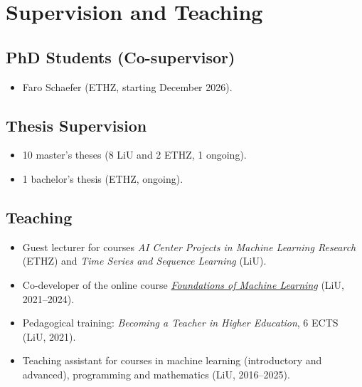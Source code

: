 \section*{Supervision and Teaching}

\subsection*{PhD Students (Co-supervisor)}
\begin{itemize}
    \item Faro Schaefer (ETHZ, starting December 2026).
\end{itemize}

\subsection*{Thesis Supervision}
\begin{itemize}
    \item 10 master's theses (8 LiU and 2 ETHZ, 1 ongoing).
    \item 1 bachelor's thesis (ETHZ, ongoing).
\end{itemize}

\subsection*{Teaching}
\begin{itemize}
    \item Guest lecturer for courses \textit{AI Center Projects in Machine Learning Research} (ETHZ) and \textit{Time Series and Sequence Learning} (LiU).
    \item Co-developer of the online course \href{https://foundations-of-ml.ida.liu.se/}{\textit{Foundations of Machine Learning}} (LiU, 2021--2024).
    \item Pedagogical training: \textit{Becoming a Teacher in Higher Education}, 6 ECTS (LiU, 2021).
    \item Teaching assistant for courses in machine learning (introductory and advanced), programming and mathematics (LiU, 2016--2025).
\end{itemize}
